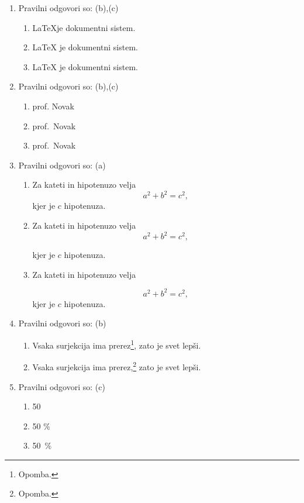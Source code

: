 \documentclass[11pt]{article}
\begin{document}
\begin{enumerate}
    \item Pravilni odgovori so: (b),(c)
    \begin{enumerate}
        \item \LaTeX je dokumentni sistem.
        \item {\LaTeX} je dokumentni sistem.
        \item \LaTeX{} je dokumentni sistem.
    \end{enumerate}

    \item Pravilni odgovori so: (b),(c)
    \begin{enumerate}
        \item prof. Novak
        \item prof.~Novak
        \item prof.\ Novak
    \end{enumerate}

    \item Pravilni odgovori so: (a)
    \begin{enumerate}
        \item
Za kateti in hipotenuzo velja
\[
  a^2 + b^2 = c^2,
\]
kjer je \(c\) hipotenuza.
        \item
Za kateti in hipotenuzo velja
\[
  a^2 + b^2 = c^2,
\]

kjer je \(c\) hipotenuza.
        \item
Za kateti in hipotenuzo velja

\[
  a^2 + b^2 = c^2,
\]
kjer je \(c\) hipotenuza.
    \end{enumerate}

    \item Pravilni odgovori so: (b)
    \begin{enumerate}
        \item Vsaka surjekcija ima prerez\footnote{Opomba.}, zato je svet lepši.
        \item Vsaka surjekcija ima prerez,\footnote{Opomba.} zato je svet lepši.
    \end{enumerate}

    \item Pravilni odgovori so: (c)
    \begin{enumerate}
        \item 50 %
        \item 50 \%
        \item 50~\%
    \end{enumerate}


\end{enumerate}
\end{document}
